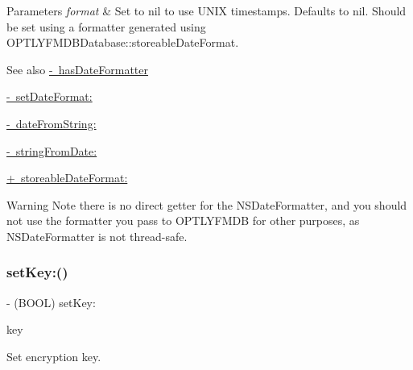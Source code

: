 \begin{DoxyParams}{Parameters}
{\em format} & Set to nil to use U\+N\+IX timestamps. Defaults to nil. Should be set using a formatter generated using O\+P\+T\+L\+Y\+F\+M\+D\+B\+Database\+::storeable\+Date\+Format.\\
\hline
\end{DoxyParams}
\begin{DoxySeeAlso}{See also}
\mbox{\hyperlink{interface_o_p_t_l_y_f_m_d_b_database_a820a1ababb4c5496800b9bcd5f2de784}{-\/ has\+Date\+Formatter}} 

\mbox{\hyperlink{interface_o_p_t_l_y_f_m_d_b_database_a48c1936bc68ddd11cea9aa177b0cc94e}{-\/ set\+Date\+Format\+:}} 

\mbox{\hyperlink{interface_o_p_t_l_y_f_m_d_b_database_a5368268fe8e6d881d0da4d3538607768}{-\/ date\+From\+String\+:}} 

\mbox{\hyperlink{interface_o_p_t_l_y_f_m_d_b_database_a60793c2b214e29c00143fdf9510837d7}{-\/ string\+From\+Date\+:}} 

\mbox{\hyperlink{interface_o_p_t_l_y_f_m_d_b_database_acb3eef48cd21dcb11407b88dac662c57}{+ storeable\+Date\+Format\+:}}
\end{DoxySeeAlso}
\begin{DoxyWarning}{Warning}
Note there is no direct getter for the {\ttfamily N\+S\+Date\+Formatter}, and you should not use the formatter you pass to O\+P\+T\+L\+Y\+F\+M\+DB for other purposes, as {\ttfamily N\+S\+Date\+Formatter} is not thread-\/safe. 
\end{DoxyWarning}
\mbox{\label{interface_o_p_t_l_y_f_m_d_b_database_a2b567d61e78a76a365b37df2f8d65bf7}} 
\subsubsection{\texorpdfstring{set\+Key\+:()}{setKey:()}}
{\footnotesize\ttfamily -\/ (B\+O\+OL) set\+Key\+: \begin{DoxyParamCaption}\item[{(N\+S\+String$\ast$)}]{key }\end{DoxyParamCaption}}

Set encryption key.


